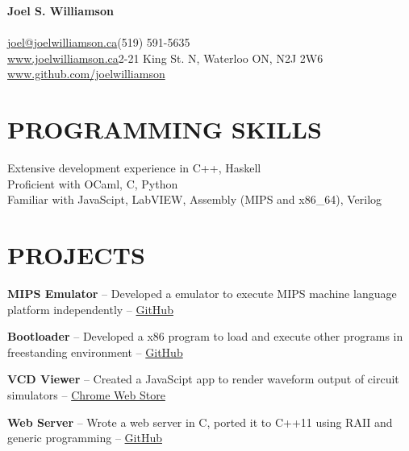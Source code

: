 \documentclass{res}
\begin{document}
 

\begin{center}
{\Large\bf Joel S. Williamson}
\end{center}
\vspace{-5mm}
\paragraph{}
       \href{mailto:joel@joelwilliamson.ca}{joel@joelwilliamson.ca}\hfill(519) 591-5635\\
       \url{www.joelwilliamson.ca}\hfill2-21 King St. N, Waterloo ON, N2J 2W6\\
       \url{www.github.com/joelwilliamson}
 
\begin{resume}

  \section{PROGRAMMING SKILLS}
  \vspace{3mm}
    Extensive development experience in C++, Haskell\\
    Proficient with OCaml, C, Python\\
    Familiar with JavaScipt, LabVIEW, Assembly (MIPS and x86\_64), Verilog
 

\section{PROJECTS}
  \vspace{3mm}
    {\bf MIPS Emulator} -- Developed a emulator to execute MIPS machine language platform independently --
    \href{https://github.com/joelwilliamson/MIPS-emulator}{GitHub}
    \vspace{-3mm}

    {\bf Bootloader} -- Developed a x86 program to load and execute other programs in freestanding environment --
    \href{https://github.com/joelwilliamson/AMD64/tree/master/barebones}{GitHub}
    \vspace{-3mm}

    {\bf VCD Viewer} -- Created a JavaScipt app to render waveform output of circuit simulators --
    \href{https://chrome.google.com/webstore/detail/vcd-viewer/fpacodjpmmabkjooobgbpgpmgbfjidkg?hl=en-US}{Chrome Web Store}
    \vspace{-3mm}

    {\bf Web Server} -- Wrote a web server in C, ported it to C++11 using RAII and generic programming --
    \href{https://www.github.com/joelwilliamson/JServer}{GitHub}
    \vspace{-3mm}


\end{resume}
\end{document}

